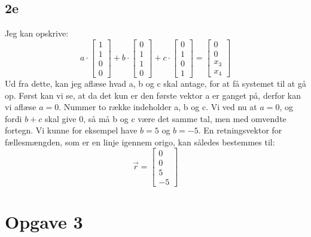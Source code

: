 \documentclass{article}
\begin{document}
\subsection*{2e}
Jeg kan opskrive:
$$
a \cdot\left[\begin{array}{l}
1 \\
1 \\
0 \\
0
\end{array}\right]+b \cdot\left[\begin{array}{l}
0 \\
1 \\
1 \\
0
\end{array}\right]+c \cdot\left[\begin{array}{l}
0 \\
1 \\
0 \\
1
\end{array}\right]=\left[\begin{array}{c}
0 \\
0 \\
x_3 \\
x_4
\end{array}\right]
$$
Ud fra dette, kan jeg aflæse hvad a, b og c skal antage, for at få systemet til at gå op. Først kan vi se, at da det kun er den første vektor a er ganget på, derfor kan vi aflæse $a=0$. Nummer to række indeholder a, b og c. Vi ved nu at $a=0$, og fordi $b+c$ skal give 0, så må b og c være det samme tal, men med omvendte fortegn. Vi kunne for eksempel have $b=5$ og $b=-5$.
En retningsvektor for fællesmængden, som er en linje igennem origo, kan således bestemmes til: 
$$
\vec{r}=\left[\begin{array}{c}
0 \\
0 \\
5 \\
-5
\end{array}\right]
$$
\section*{Opgave 3}
\end{document}
